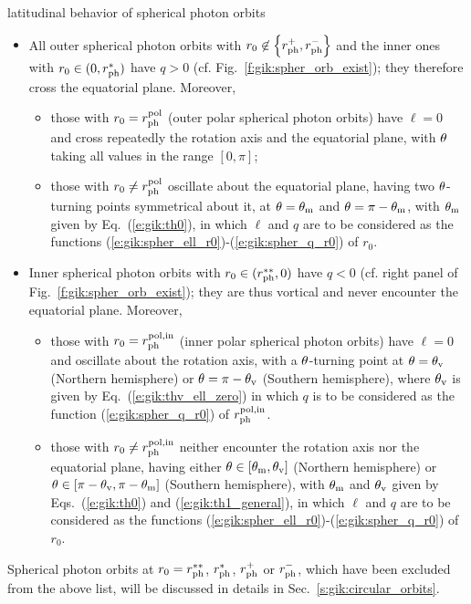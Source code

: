 \begin{tprop}{latitudinal behavior of spherical photon orbits}{}
\begin{itemize}
\item All outer spherical photon orbits with $r_0\not\in \left\{r_{\rm ph}^+, r_{\rm ph}^-\right\}$ and the inner ones with $r_0\in (0, r_{\rm ph}^{*})$
have $q>0$ (cf. Fig.~\ref{f:gik:spher_orb_exist}); they therefore cross the equatorial plane.
Moreover,
\begin{itemize}
\item those with $r_0 = r_{\rm ph}^{\rm pol}$ (outer polar spherical photon orbits)
have $\ell=0$
and cross repeatedly the rotation axis and the equatorial plane, with $\theta$
taking all values in the range $[0,\pi]$;
\item those with $r_0 \neq r_{\rm ph}^{\rm pol}$
oscillate about the equatorial plane, having two $\theta$-turning points
symmetrical about it, at $\theta=\theta_{\rm m}$ and $\theta=\pi-\theta_{\rm m}$, with
$\theta_{\rm m}$ given by Eq.~(\ref{e:gik:th0}),
in which $\ell$ and $q$ are to be considered as the functions
(\ref{e:gik:spher_ell_r0})-(\ref{e:gik:spher_q_r0}) of $r_0$.
\end{itemize}
\item Inner spherical photon orbits with $r_0 \in (r_{\rm ph}^{**}, 0)$
have $q<0$ (cf. right panel of Fig.~\ref{f:gik:spher_orb_exist}); they are thus vortical
and never encounter the equatorial plane. Moreover,
\begin{itemize}
\item those with $r_0 = r_{\rm ph}^{\rm pol, in}$ (inner polar spherical photon orbits)
have $\ell=0$ and oscillate about the rotation axis,
with a $\theta$-turning point at
$\theta=\theta_{\rm v}$ (Northern hemisphere) or $\theta = \pi - \theta_{\rm v}$ (Southern hemisphere),
where $\theta_{\rm v}$
is given by Eq.~(\ref{e:gik:thv_ell_zero}) in which $q$ is to be considered
as the function (\ref{e:gik:spher_q_r0}) of $r_{\rm ph}^{\rm pol, in}$.
\item those with $r_0 \neq r_{\rm ph}^{\rm pol, in}$ neither encounter the rotation axis nor the
equatorial plane, having
either $\theta\in[\theta_{\rm m}, \theta_{\rm v}]$ (Northern hemisphere)
or $\theta\in[\pi-\theta_{\rm v}, \pi-\theta_{\rm m}]$ (Southern hemisphere), with
$\theta_{\rm m}$ and $\theta_{\rm v}$ given by Eqs.~(\ref{e:gik:th0}) and (\ref{e:gik:th1_general}), in which
$\ell$ and $q$ are to be considered as the functions
(\ref{e:gik:spher_ell_r0})-(\ref{e:gik:spher_q_r0}) of $r_0$.
\end{itemize}
\end{itemize}
Spherical photon orbits at $r_0 = r_{\rm ph}^{**}$, $r_{\rm ph}^*$, $r_{\rm ph}^+$ or $r_{\rm ph}^-$,
which have been excluded from the above list,
will be discussed in details in Sec.~\ref{s:gik:circular_orbits}.
\end{tprop}

